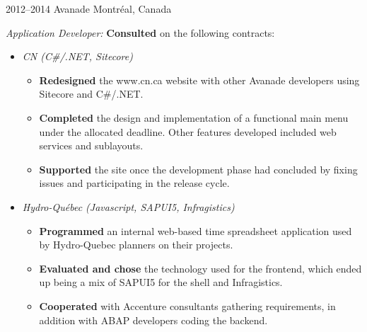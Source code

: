\documentclass[]{friggeri-cv}
\begin{document}
\begin{entrylist}

\entry
{2012--2014}
{Avanade}
{Montréal, Canada}
{\emph{Application Developer:}
\textbf{Consulted} on the following contracts:
\begin{itemize}
\item \emph{CN (C\#/.NET, Sitecore)}
\begin{itemize}
	\item \textbf{Redesigned} the www.cn.ca website with other Avanade developers using Sitecore and C\#/.NET.
	\item \textbf{Completed} the design and implementation of a functional main menu under the  allocated deadline. Other features developed included web services and sublayouts.
	\item \textbf{Supported} the site once the development phase had concluded by fixing issues and participating in the release cycle.
\end{itemize}
\item \emph{Hydro-Québec (Javascript, SAPUI5, Infragistics)}
\begin{itemize}
	\item \textbf{Programmed} an internal web-based time spreadsheet application used by Hydro-Quebec planners on their projects.
	\item \textbf{Evaluated and chose} the technology used for the frontend, which ended up being a mix of SAPUI5 for the shell and Infragistics.
	\item \textbf{Cooperated} with Accenture consultants gathering requirements, in addition with ABAP developers coding the backend.
\end{itemize}
\end{itemize}
}
\end{entrylist}

\newpage
\end{document}
